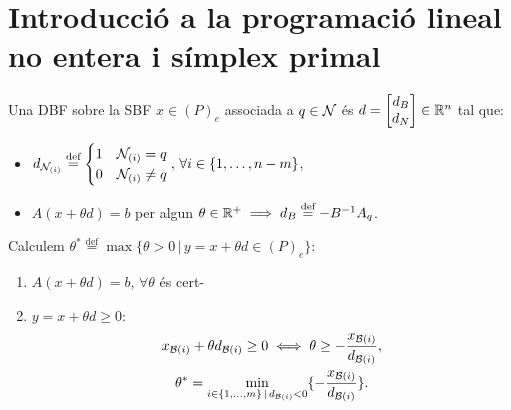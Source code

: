 \section{Introducció a la programació lineal no entera i símplex primal}

\begin{defi}
    Una DBF sobre la SBF $x \in (P)_e$ associada a $q \in \mathcal{N}$ és $d =
    \begin{bmatrix}
        d_B \\
        d_N
    \end{bmatrix}
    \in \mathbb{R}^n$ tal que:
    \begin{itemize}
        \item $d_{\mathcal{N}_{(i)}} \stackrel{\text{def}}{=}
            \begin{cases}
                1 & \mathcal{N}_{(i)} = q \\
                0 & \mathcal{N}_{(i)} \neq q
            \end{cases}
            ,\, \forall i \in \{1, \dots, n-m \}$,
        \item $A (x + \theta d) = b$ per algun $\theta \in \mathbb{R}^+ \implies d_B \stackrel{\text{def}}{=} -B^{-1} A_q$.
    \end{itemize}
\end{defi}
\begin{prop}
    Calculem $\theta^* \stackrel{\text{def}}{=} \max \{ \theta > 0 \, |\, y = x + \theta d \in (P)_e\}$:
    \begin{enumerate}
        \item $A(x + \theta d) = b,\, \forall \theta$ és cert-
        \item $y = x + \theta d \geq 0$:
            \begin{gather*}
                x_{\mathcal{B}(i)} + \theta d_{\mathcal{B}(i)} \geq 0 \iff \theta \geq -\frac{x_{\mathcal{B}(i)}}{d_{\mathcal{B}(i)}}, \\
                \theta^* = \min_{i \in \{1, \dots, m \} \, |\, d_{\mathcal{B}(i)} < 0} \{ - \frac{x_{\mathcal{B}(i)}}{d_{\mathcal{B}(i)}} \}.
            \end{gather*}
    \end{enumerate}
\end{prop}
